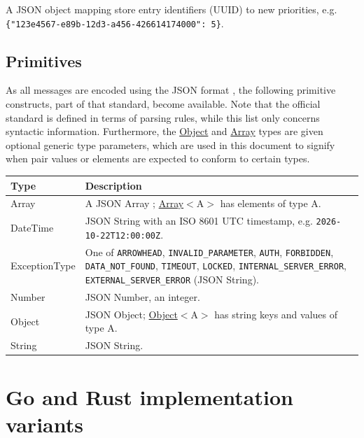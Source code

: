 \documentclass[a4paper]{arrowhead}
\newcommand{\pdef}[1]{{\textcolor{ArrowheadGrey}{#1 \label{sec:model:primitives:#1} \label{sec:model:primitives:#1s}}}}
\newcommand{\pref}[1]{{\textcolor{ArrowheadGrey}{\hyperref[sec:model:primitives:#1]{#1}}}}
\begin{document}

A JSON object mapping store entry identifiers (UUID) to new priorities, e.g. \texttt{\{"123e4567-\allowbreak{}e89b-\allowbreak{}12d3-\allowbreak{}a456-\allowbreak{}426614174000": 5\}}.



\subsection{Primitives}
\label{sec:model:primitives}

As all messages are encoded using the JSON format \cite{rfc8259}, the following primitive constructs, part of that standard, become available.
Note that the official standard is defined in terms of parsing rules, while this list only concerns syntactic information.
Furthermore, the \pref{Object} and \pref{Array} types are given optional generic type parameters, which are used in this document to signify when pair values or elements are expected to conform to certain types.

\noindent\begin{tabularx}{\textwidth}{| p{4.6cm} | X |} \hline
\rowcolor{gray!33} Type & Description \\ \hline
\pdef{Array} & A JSON Array \cite{rfc8259}; \pref{Array}$<$A$>$ has elements of type A. \\ \hline
\pdef{DateTime} & JSON String with an ISO 8601 UTC timestamp, e.g. \texttt{2026-10-22T12:00:00Z}. \\ \hline
\pdef{ExceptionType} & One of \texttt{ARROWHEAD}, \texttt{INVALID\_\allowbreak{}PARAMETER}, \texttt{AUTH}, \texttt{FORBIDDEN}, \texttt{DATA\_\allowbreak{}NOT\_\allowbreak{}FOUND}, \texttt{TIMEOUT}, \texttt{LOCKED}, \texttt{INTERNAL\_\allowbreak{}SERVER\_\allowbreak{}ERROR}, \texttt{EXTERNAL\_\allowbreak{}SERVER\_\allowbreak{}ERROR} (JSON String). \\ \hline
\pdef{Number} & JSON Number, an integer. \\ \hline
\pdef{Object} & JSON Object; \pref{Object}$<$A$>$ has string keys and values of type A. \\ \hline
\pdef{String} & JSON String. \\ \hline
\end{tabularx}

\newpage

\section{Go and Rust implementation variants}
\end{document}
